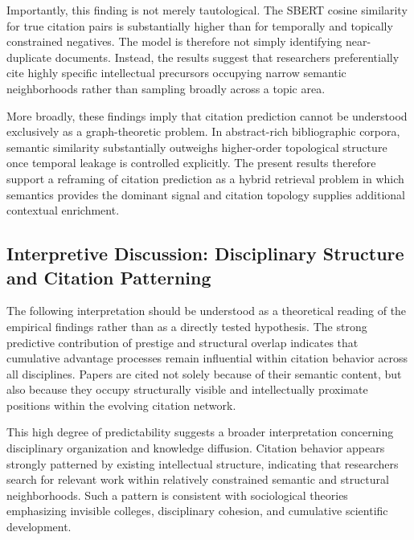 \documentclass[11pt,a4paper]{article}
\begin{document}
Importantly, this finding is not merely tautological. The SBERT cosine similarity for true citation pairs is substantially higher than for temporally and topically constrained negatives. The model is therefore not simply identifying near-duplicate documents. Instead, the results suggest that researchers preferentially cite highly specific intellectual precursors occupying narrow semantic neighborhoods rather than sampling broadly across a topic area.

More broadly, these findings imply that citation prediction cannot be understood exclusively as a graph-theoretic problem. In abstract-rich bibliographic corpora, semantic similarity substantially outweighs higher-order topological structure once temporal leakage is controlled explicitly. The present results therefore support a reframing of citation prediction as a hybrid retrieval problem in which semantics provides the dominant signal and citation topology supplies additional contextual enrichment.

\subsection{Interpretive Discussion: Disciplinary Structure and Citation Patterning}

The following interpretation should be understood as a theoretical reading of the empirical findings rather than as a directly tested hypothesis. The strong predictive contribution of prestige and structural overlap indicates that cumulative advantage processes remain influential within citation behavior across all disciplines. Papers are cited not solely because of their semantic content, but also because they occupy structurally visible and intellectually proximate positions within the evolving citation network.

This high degree of predictability suggests a broader interpretation concerning disciplinary organization and knowledge diffusion. Citation behavior appears strongly patterned by existing intellectual structure, indicating that researchers search for relevant work within relatively constrained semantic and structural neighborhoods. Such a pattern is consistent with sociological theories emphasizing invisible colleges, disciplinary cohesion, and cumulative scientific development.
\end{document}
